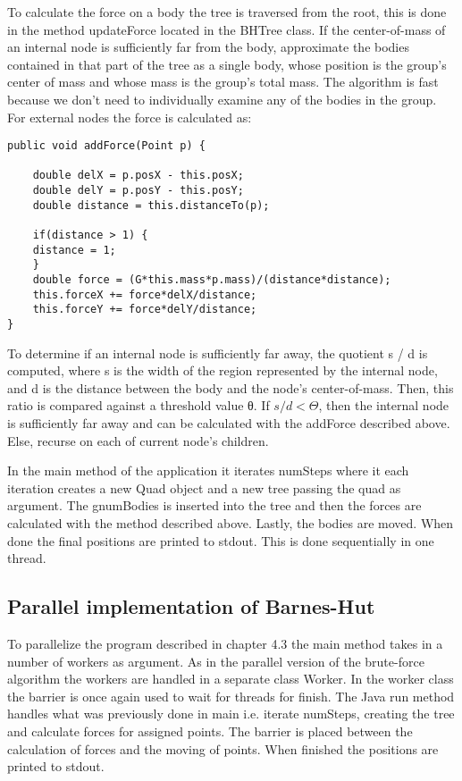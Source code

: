 \documentclass{article}
\begin{document}
To calculate the force on a body the tree is traversed from the root, this is done in the method updateForce located in the BHTree class. If the center-of-mass of an internal node is sufficiently far from the body, approximate the bodies contained in that part of the tree as a single body, whose position is the group’s center of mass and whose mass is the group’s total mass. The algorithm is fast because we don’t need to individually examine any of the bodies in the group. For external nodes the force is calculated as: 
\begin{verbatim} 
public void addForce(Point p) {         

    double delX = p.posX - this.posX;         
    double delY = p.posY - this.posY;         
    double distance = this.distanceTo(p);                  

    if(distance > 1) {            
    distance = 1;         
    }          
    double force = (G*this.mass*p.mass)/(distance*distance);         
    this.forceX += force*delX/distance;         
    this.forceY += force*delY/distance;     
}
\end{verbatim}
To determine if an internal node is sufficiently far away, the quotient s / d is computed, where s is the width of the region represented by the internal node, and d is the distance between the body and the node’s center-of-mass. Then, this ratio is compared against a threshold value θ. If \(s / d < \Theta\), then the internal node is sufficiently far away and can be calculated with the addForce described above. Else, recurse on each of current node's children. 

In the main method of the application it iterates numSteps where it each iteration creates a new Quad object and a new tree passing the quad as argument. The gnumBodies is inserted into the tree and then the forces are calculated with the method described above. Lastly, the bodies are moved. When done the final positions are printed to stdout. This is done sequentially in one thread. 

\subsection{Parallel implementation of Barnes-Hut}

To parallelize the program described in chapter 4.3 the main method takes in a number of workers as argument. As in the parallel version of the brute-force algorithm the workers are handled in a separate class Worker. In the worker class the barrier is once again used to wait for threads for finish.  The Java run method handles what was previously done in main i.e. iterate numSteps, creating the tree and calculate forces for assigned points. The barrier is placed between the calculation of forces and the moving of points. When finished the positions are printed to stdout. 
\end{document}
